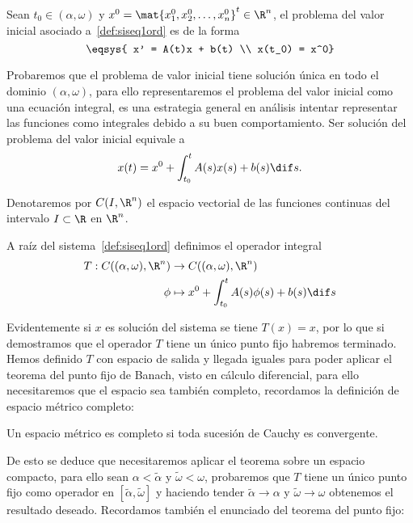 \documentclass[../main.tex]{subfiles}
\begin{document}
\begin{definition}
	Sean \(t_0 \in (\alpha, \omega)\) y 
	\(x^0 = \mat{x^0_1, x^0_2, \dots, x^0_n}^t \in \R^n\), el problema del valor
	inicial asociado a~\ref{def:siseq1ord} es de la forma
	\[\eqsys{
		x' = A(t)x + b(t) \\
		x(t_0) = x^0}\]
\end{definition}

Probaremos que el problema de valor inicial tiene solución única en todo el
dominio \((\alpha, \omega)\), para ello representaremos el problema del valor 
inicial como una ecuación integral, es una estrategia general en análisis 
intentar representar las funciones como integrales debido a su buen
comportamiento. Ser solución del problema del valor inicial equivale a
\[x(t) = x^0 + \int_{t_0}^t A(s)x(s) + b(s) \dif s.\]

Denotaremos por \(C(I, \R^n)\) el espacio vectorial de las funciones continuas
del intervalo \(I \subset \R\) en \(\R^n\).

A raíz del sistema~\ref{def:siseq1ord} definimos el operador integral
\begin{align*}
  T : C((\alpha, \omega), \R^n) &\to C((\alpha, \omega), \R^n) \\
  \phi  &\mapsto x^0 + \int_{t_0}^t A(s) \phi(s) + b(s) \dif s
\end{align*}

Evidentemente si \(x\) es solución del sistema se tiene \(T(x) = x\), por lo que
si demostramos que el operador \(T\) tiene un único punto fijo habremos
terminado. Hemos definido \(T\) con espacio de salida y llegada iguales para
poder aplicar el teorema del punto fijo de Banach, visto en cálculo diferencial,
para ello necesitaremos que el espacio sea también completo, recordamos la
definición de espacio métrico completo:

\begin{definition}
	Un espacio métrico es completo si toda sucesión de Cauchy es convergente.
\end{definition}

De esto se deduce que necesitaremos aplicar el teorema sobre un espacio
compacto, para ello sean
\(\alpha < \tilde{\alpha}\) y \(\tilde{\omega} < \omega\), probaremos que 
\(T\) tiene un único punto fijo como operador en 
\([\tilde{\alpha}, \tilde{\omega}]\) y haciendo tender 
\(\tilde{\alpha} \to \alpha\) y \(\tilde{\omega} \to \omega\) obtenemos el
resultado deseado. Recordamos también el enunciado del teorema del punto fijo:
\end{document}
